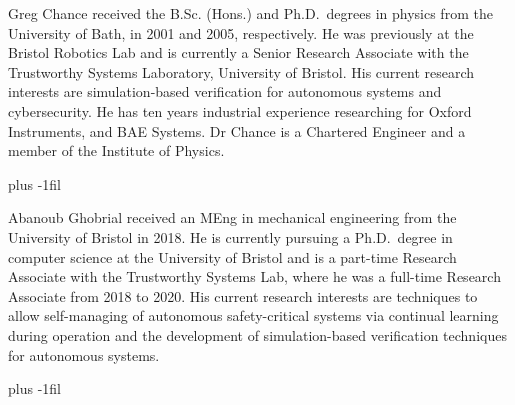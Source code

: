 \documentclass[letterpaper, 10 pt, journal, twoside]{IEEEtran}
\begin{document}
\begin{IEEEbiography}{Greg Chance}
received the B.Sc. (Hons.) and Ph.D.\ degrees in physics from the University of Bath, in 2001 and 2005, respectively. He was previously at the Bristol Robotics Lab and is currently a Senior Research Associate with the Trustworthy Systems Laboratory, University of Bristol. His current research interests are simulation-based verification for autonomous systems and cybersecurity. He has ten years industrial experience researching for Oxford Instruments, and BAE Systems. Dr Chance is a Chartered Engineer and a member of the Institute of Physics. 
\end{IEEEbiography}
\baselineskip plus -1fil  
\begin{IEEEbiography}{Abanoub Ghobrial}
received an MEng in mechanical engineering from the University of Bristol in 2018. He is currently pursuing a Ph.D.\ degree in computer science at the University of Bristol and is a part-time Research Associate with the Trustworthy Systems Lab, where he was a full-time Research Associate from 2018 to 2020. His current research interests are techniques to allow self-managing of autonomous safety-critical systems via continual learning during operation and the development of simulation-based verification techniques for autonomous systems.
\end{IEEEbiography}

\baselineskip plus -1fil  
\end{document}
